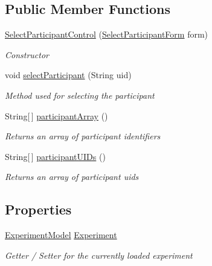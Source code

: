 \subsection*{Public Member Functions}
\begin{DoxyCompactItemize}
\item 
\hyperlink{class_web_analyzer_1_1_u_i_1_1_interaction_objects_1_1_select_participant_control_a5e32876cf2be99557c7c68d2e127448e}{Select\+Participant\+Control} (\hyperlink{class_web_analyzer_1_1_u_i_1_1_select_participant_form}{Select\+Participant\+Form} form)
\begin{DoxyCompactList}\small\item\em Constructor \end{DoxyCompactList}\item 
void \hyperlink{class_web_analyzer_1_1_u_i_1_1_interaction_objects_1_1_select_participant_control_a770eee3d5aa9ed696bf44e252b733892}{select\+Participant} (String uid)
\begin{DoxyCompactList}\small\item\em Method used for selecting the participant \end{DoxyCompactList}\item 
String\mbox{[}$\,$\mbox{]} \hyperlink{class_web_analyzer_1_1_u_i_1_1_interaction_objects_1_1_select_participant_control_a470db28a84372495c8e93d4820836f67}{participant\+Array} ()
\begin{DoxyCompactList}\small\item\em Returns an array of participant identifiers \end{DoxyCompactList}\item 
String\mbox{[}$\,$\mbox{]} \hyperlink{class_web_analyzer_1_1_u_i_1_1_interaction_objects_1_1_select_participant_control_a4092c226a33e62a4c94c480f3446f41d}{participant\+U\+I\+Ds} ()
\begin{DoxyCompactList}\small\item\em Returns an array of participant uids \end{DoxyCompactList}\end{DoxyCompactItemize}
\subsection*{Properties}
\begin{DoxyCompactItemize}
\item 
\hyperlink{class_web_analyzer_1_1_models_1_1_base_1_1_experiment_model}{Experiment\+Model} \hyperlink{class_web_analyzer_1_1_u_i_1_1_interaction_objects_1_1_select_participant_control_a2676543013c6706859d21701a8f78000}{Experiment}
\begin{DoxyCompactList}\small\item\em Getter / Setter for the currently loaded experiment \end{DoxyCompactList}\end{DoxyCompactItemize}
